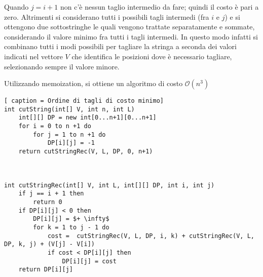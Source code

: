 \documentclass[../cheatSheetAlgoritmi.tex]{subfiles}
\begin{document}
Quando $j = i + 1$ non c'è nessun taglio intermedio da fare; quindi il costo è pari a zero. Altrimenti si considerano tutti i possibili tagli intermedi (fra $i$ e $j$) e si ottengono due sottostringhe le quali vengono trattate separatamente e sommate, considerando il valore minimo fra tutti i tagli intermedi. In questo modo infatti si combinano tutti i modi possibili per tagliare la stringa a seconda dei valori indicati nel vettore $V$ che identifica le posizioni dove è necessario tagliare, selezionando sempre il valore minore. 

Utilizzando memoization, si ottiene un algoritmo di costo $\mathcal{O}(n^3)$
 
\begin{lstlisting}[ caption = Ordine di tagli di costo minimo]
int cutString(int[] V, int n, int L)
	int[][] DP = new int[0...n+1][0...n+1]
	for i = 0 to n +1 do
		for j = 1 to n +1 do
			DP[i][j] = -1
	return cutStringRec(V, L, DP, 0, n+1)



int cutStringRec(int[] V, int L, int[][] DP, int i, int j)
	if j == i + 1 then
		return 0
	if DP[i][j] < 0 then
		DP[i][j] = $+ \infty$
		for k = 1 to j - 1 do
			cost =  cutStringRec(V, L, DP, i, k) + cutStringRec(V, L, DP, k, j) + (V[j] - V[i])
			if cost < DP[i][j] then
				DP[i][j] = cost
	return DP[i][j]
\end{lstlisting}
 
\end{document}
